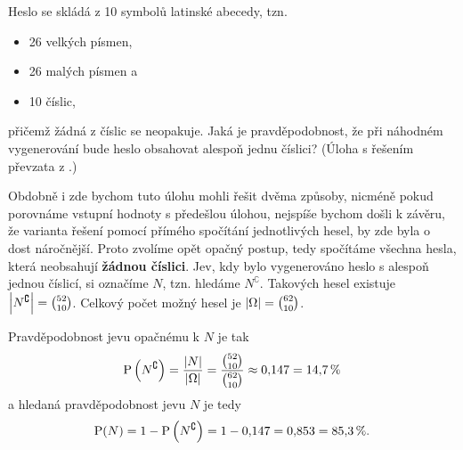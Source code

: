 \begin{task}
    Heslo se skládá z 10 symbolů latinské abecedy, tzn.
    \begin{itemize}
        \item 26 velkých písmen,
        \item 26 malých písmen a
        \item 10 číslic,
    \end{itemize}
    přičemž žádná z číslic se neopakuje. Jaká je pravděpodobnost, že při náhodném vygenerování bude heslo obsahovat alespoň jednu číslici? (Úloha s řešením převzata z \cite{Tiser2022}.)
\end{task}
\begin{solution}
    Obdobně i zde bychom tuto úlohu mohli řešit dvěma způsoby, nicméně pokud porovnáme vstupní hodnoty s předešlou úlohou, nejspíše bychom došli k závěru, že varianta řešení pomocí přímého spočítání jednotlivých hesel, by zde byla o dost náročnější. Proto zvolíme opět opačný postup, tedy spočítáme všechna hesla, která neobsahují \textbf{žádnou číslici}. Jev, kdy bylo vygenerováno heslo s alespoň jednou číslicí, si označíme $N$, tzn. hledáme $N^\complement$. Takových hesel existuje $\left| N^\complement \right|=\binom{52}{10}$. Celkový počet možný hesel je $\left| \Omega \right|=\binom{62}{10}$.\par
    Pravděpodobnost jevu opačnému k $N$ je tak
    \[\operatorname{\text{P}}\left(N^\complement\right)=\dfrac{\left| N \right|}{\left| \Omega \right|}=\dfrac{\binom{52}{10}}{\binom{62}{10}}\approx 0{,}147=14{,}7\,\%\]
    a hledaná pravděpodobnost jevu $N$ je tedy
    \[\operatorname{\text{P}}(N)=1-\operatorname{\text{P}}\left(N^\complement\right)=1-0{,}147=0{,}853=85{,}3\,\%.\]
\end{solution}